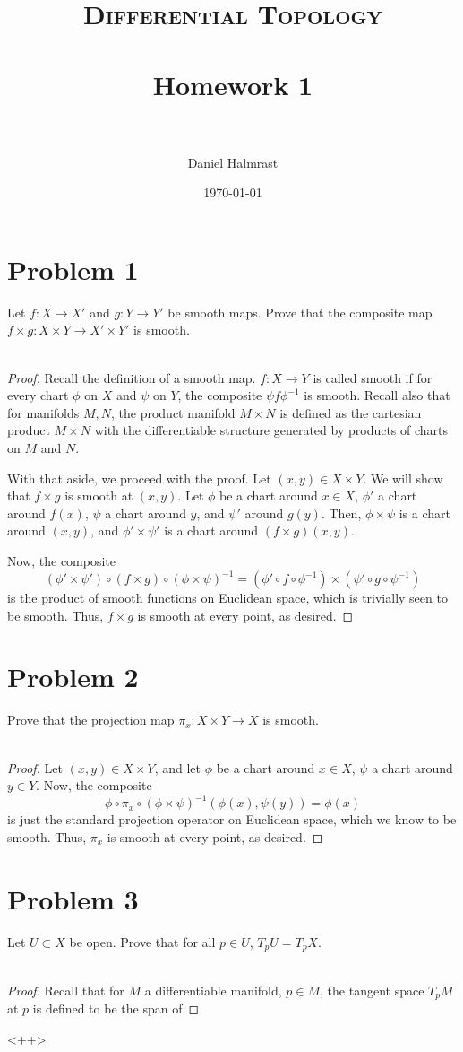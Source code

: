 \documentclass[fontsize=11pt]{scrartcl} %
\title{	
\normalfont \normalsize 
\textsc{Differential Topology} \\ [25pt] %
\horrule{0.5pt} \\[0.4cm] %
\huge Homework 1 \\ %
\horrule{2pt} \\[0.5cm] %
}
\author{Daniel Halmrast} %
\date{\normalsize\today} %
\numberwithin{equation}{section} %
\numberwithin{figure}{section} %
\numberwithin{table}{section} %
\begin{document}
\maketitle %

\section*{Problem 1}
Let $f:X\to X'$ and $g:Y\to Y'$ be smooth maps. Prove that the composite map
$f\times g:X\times Y\to X'\times Y'$ is smooth.
\\
\\
\begin{proof}
    Recall the definition of a smooth map. $f:X\to Y$ is called smooth if for
    every chart $\phi$ on $X$ and $\psi$ on $Y$, the composite $\psi f\phi^{-1}$
    is smooth. Recall also that for manifolds $M,N$, the product manifold
    $M\times N$ is defined as the cartesian product $M\times N$ with the
    differentiable structure generated by products of charts on $M$ and $N$.

    With that aside, we proceed with the proof. Let $(x,y)\in X\times Y$. We
    will show that $f\times g$ is smooth at $(x,y)$. Let $\phi$ be a chart
    around $x\in X$, $\phi'$ a chart around $f(x)$, $\psi$ a chart around $y$,
    and $\psi'$ around $g(y)$. Then, $\phi\times \psi$ is a chart around
    $(x,y)$, and $\phi'\times \psi'$ is a chart around $(f\times g)(x,y)$.

    Now, the composite 
    \[
        (\phi'\times \psi')\circ (f\times g)\circ (\phi\times
        \psi)^{-1} = (\phi'\circ f\circ \phi^{-1})\times(\psi'\circ g\circ
        \psi^{-1})
    \]
    is the product of smooth functions on Euclidean space, which is trivially
    seen to be smooth. Thus, $f\times g$ is smooth at every point, as desired.
\end{proof}

\newpage

\section*{Problem 2}
Prove that the projection map $\pi_x:X\times Y\to X$ is smooth.
\\
\\
\begin{proof}
    Let $(x,y)\in X\times Y$, and let $\phi$ be a chart around $x\in X$, $\psi$
    a chart around $y\in Y$. Now, the composite
    \[
        \phi\circ\pi_x\circ(\phi\times \psi)^{-1}(\phi(x),\psi(y)) = \phi(x)
    \]
    is just the standard projection operator on Euclidean space, which we know
    to be smooth. Thus, $\pi_x$ is smooth at every point, as desired.
\end{proof}

\newpage

\section*{Problem 3}
Let $U\subset X$ be open. Prove that for all $p\in U$, $T_pU = T_pX$.
\\
\\
\begin{proof}
    Recall that for $M$ a differentiable manifold, $p\in M$, the tangent space
    $T_pM$ at $p$ is defined to be the span of 
\end{proof}<++>
\end{document}
